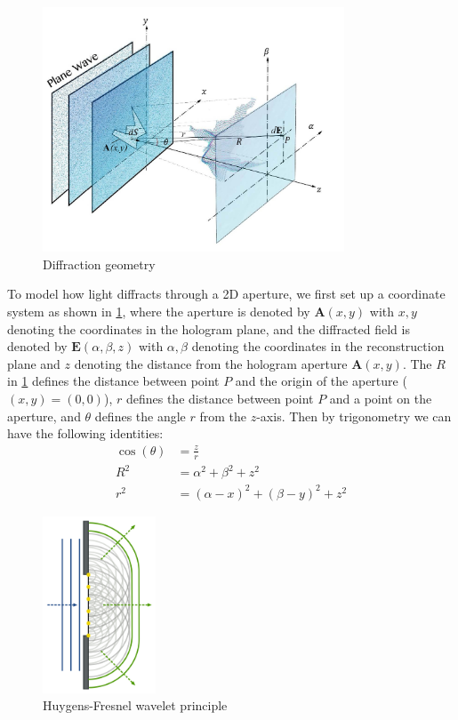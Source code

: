 \begin{figure}[H]
  \centering
  \includegraphics[width=0.8\textwidth]{diffraction_coordinate_definition.jpg}
  \caption{Diffraction geometry}\label{fig:diffraction_coordinate_definition}
\end{figure}

To model how light diffracts through a 2D aperture, we first set up a coordinate system as shown in \cref{fig:diffraction_coordinate_definition}, where the aperture is denoted by $\textbf{A}(x, y)$ with $x, y$ denoting the coordinates in the hologram plane, and the diffracted field is denoted by $\textbf{E}(\alpha, \beta, z)$ with $\alpha, \beta$ denoting the coordinates in the reconstruction plane and $z$ denoting the distance from the hologram aperture $\textbf{A}(x, y)$. The $R$ in \cref{fig:diffraction_coordinate_definition} defines the distance between point $P$ and the origin of the aperture ($(x,y)=(0,0)$), $r$ defines the distance between point $P$ and a point on the aperture, and $\theta$ defines the angle $r$ from the $z$-axis. Then by trigonometry we can have the following identities:
\begin{align}
  \cos(\theta) & = \frac{z}{r}                      \label{eq:trignometry-theta} \\
  R^2         & = \alpha ^2 + \beta ^2 + z^2       \label{eq:trignometry-R} \\
  r^2         & = (\alpha-x)^2 + (\beta-y)^2 + z^2 \label{eq:trignometry-r}
\end{align}

\begin{figure}[H]
  \centering
  \includegraphics[width=0.3\textwidth]{huygens_wavelets_principle.png}
  \caption{Huygens-Fresnel wavelet principle \cite{Nordmann2007}}\label{fig:huygens_wavelets_principle}
\end{figure}

